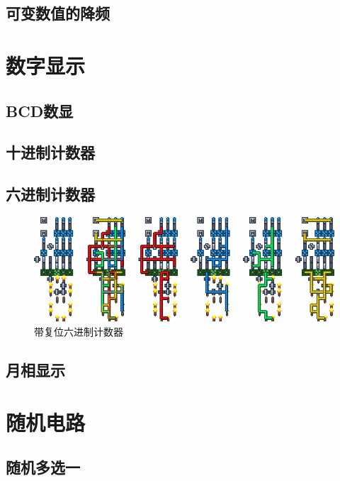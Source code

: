 \subsection{可变数值的降频}

\section{数字显示}
\subsection{BCD数显}
\subsection{十进制计数器}
\subsection{六进制计数器}
\begin{figure}
    \centering
    \includegraphics[width=\textwidth]{images/347.png}
    \caption{带复位六进制计数器}
\end{figure}
\subsection{月相显示}

\section{随机电路}
\subsection{随机多选一}
